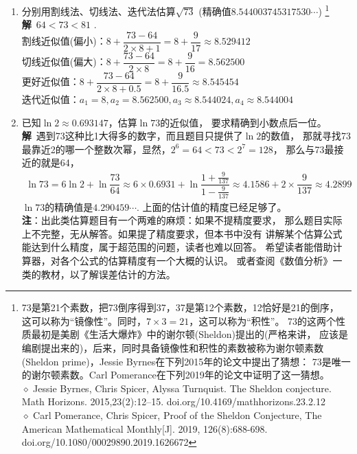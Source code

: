 \begin{enumerate}[label={【\textbf{例\thechapter.\arabic*}】},
 leftmargin=\inteval{\myenumleftmargin}pt,
 itemsep=\inteval{\myenumitempsep}pt,
 itemindent=\inteval{\myenumitemindent}pt]
\item 分别用割线法、切线法、迭代法估算$ \sqrt{73} $
(精确值$ 8.544003745317530 \cdots $)
\footnote{73是第21个素数，把73倒序得到37，37是第12个素数，12恰好是21的倒序，
这可以称为“镜像性”。同时，$ 7\times 3=21 $，这可以称为“积性”。
73的这两个性质最初是美剧《生活大爆炸》中的谢尔顿(Sheldon)提出的(严格来讲，
应该是编剧提出来的)，后来，同时具备镜像性和积性的素数被称为谢尔顿素数
(Sheldon prime)，Jessie Byrnes在下列2015年的论文中提出了猜想：
73是唯一的谢尔顿素数。Carl Pomerance在下列2019年的论文中证明了这一猜想。\\
$ \diamond $ Jessie Byrnes, Chris Spicer, Alyssa Turnquist. The Sheldon conjecture. Math Horizons. 2015,23(2):12–15.
doi.org/10.4169/mathhorizons.23.2.12 \\
$ \diamond $ Carl Pomerance, Chris Spicer, Proof of the Sheldon Conjecture, The American Mathematical Monthly[J]. 2019,
126(8):688-698. doi.org/10.1080/00029890.2019.1626672 } \\
\textbf{解}\ $ 64<73<81 $ .\\
割线近似值(偏小)：$ 8+\dfrac{73-64}{2\times 8+1}=8+\dfrac{9}{17}\approx 8.529412 $ \\
切线近似值(偏大)：$ 8+\dfrac{73-64}{2\times 8}=8+\dfrac{9}{16}= 8.562500 $ \\
更好近似值：$ 8+\dfrac{73-64}{2\times 8+0.5}=8+\dfrac{9}{16.5}\approx 8.545454 $ \\
迭代近似值：$ a_1=8,a_2=8.562500,a_3\approx 8.544024,a_4\approx8.544004  $ 

\item 已知$ \ln2\approx 0.693147 $，估算$ \ln 73 $的近似值，
要求精确到小数点后一位。\\
\textbf{解}\ 遇到73这种比1大得多的数字，而且题目只提供了$ \ln2 $的数值，
那就寻找73最靠近2的哪一个整数次幂，显然，$ 2^6=64<73<2^7=128 $，
那么与73最接近的就是64，
\begin{align*}
    \ln 73=6\ln 2+\ln \dfrac{73}{64}\approx 6\times0.6931+
    \ln\dfrac{1+\frac{9}{137}}{1-\frac{9}{137}} 
    \approx 4.1586+2\times \dfrac{9}{137}\approx 4.2899   
\end{align*}
$ \ln 73 $的精确值是$ 4.290459\cdots $. 上面的估计值的精度已经足够了。\\
\textbf{注}：出此类估算题目有一个两难的麻烦：如果不提精度要求，
那么题目实际上不完整，无从解答。如果提了精度要求，但本书中没有
讲解某个估算公式能达到什么精度，属于超范围的问题，读者也难以回答。
希望读者能借助计算器，对各个公式的估算精度有一个大概的认识。
或者查阅《数值分析》一类的教材，以了解误差估计的方法。


\end{enumerate}
